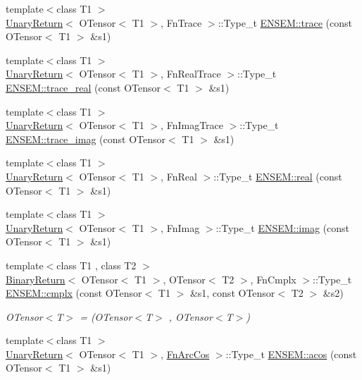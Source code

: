 \begin{DoxyCompactItemize}
{\footnotesize template$<$class T1 $>$ }\\\mbox{\hyperlink{structUnaryReturn}{Unary\+Return}}$<$ O\+Tensor$<$ T1 $>$, Fn\+Trace $>$\+::Type\+\_\+t \mbox{\hyperlink{group__obstensor_gade63bf28037560bb8bb80db95b64eacf}{E\+N\+S\+E\+M\+::trace}} (const O\+Tensor$<$ T1 $>$ \&s1)
\item 
{\footnotesize template$<$class T1 $>$ }\\\mbox{\hyperlink{structUnaryReturn}{Unary\+Return}}$<$ O\+Tensor$<$ T1 $>$, Fn\+Real\+Trace $>$\+::Type\+\_\+t \mbox{\hyperlink{group__obstensor_ga540149a8c9955de22cf6c5562ec69f2f}{E\+N\+S\+E\+M\+::trace\+\_\+real}} (const O\+Tensor$<$ T1 $>$ \&s1)
\item 
{\footnotesize template$<$class T1 $>$ }\\\mbox{\hyperlink{structUnaryReturn}{Unary\+Return}}$<$ O\+Tensor$<$ T1 $>$, Fn\+Imag\+Trace $>$\+::Type\+\_\+t \mbox{\hyperlink{group__obstensor_gab134dab9b5acf4d2d372b22d17d4b307}{E\+N\+S\+E\+M\+::trace\+\_\+imag}} (const O\+Tensor$<$ T1 $>$ \&s1)
\item 
{\footnotesize template$<$class T1 $>$ }\\\mbox{\hyperlink{structUnaryReturn}{Unary\+Return}}$<$ O\+Tensor$<$ T1 $>$, Fn\+Real $>$\+::Type\+\_\+t \mbox{\hyperlink{group__obstensor_ga6d95b4347a14db99d06a34a4aa52038b}{E\+N\+S\+E\+M\+::real}} (const O\+Tensor$<$ T1 $>$ \&s1)
\item 
{\footnotesize template$<$class T1 $>$ }\\\mbox{\hyperlink{structUnaryReturn}{Unary\+Return}}$<$ O\+Tensor$<$ T1 $>$, Fn\+Imag $>$\+::Type\+\_\+t \mbox{\hyperlink{group__obstensor_ga8fd330e1f2838b575c200fc264a4d95b}{E\+N\+S\+E\+M\+::imag}} (const O\+Tensor$<$ T1 $>$ \&s1)
\item 
{\footnotesize template$<$class T1 , class T2 $>$ }\\\mbox{\hyperlink{structBinaryReturn}{Binary\+Return}}$<$ O\+Tensor$<$ T1 $>$, O\+Tensor$<$ T2 $>$, Fn\+Cmplx $>$\+::Type\+\_\+t \mbox{\hyperlink{group__obstensor_gaabe3804eba50d35ba93cf516f1e5a85b}{E\+N\+S\+E\+M\+::cmplx}} (const O\+Tensor$<$ T1 $>$ \&s1, const O\+Tensor$<$ T2 $>$ \&s2)
\begin{DoxyCompactList}\small\item\em O\+Tensor$<$\+T$>$ = (O\+Tensor$<$\+T$>$ , O\+Tensor$<$\+T$>$) \end{DoxyCompactList}\item 
{\footnotesize template$<$class T1 $>$ }\\\mbox{\hyperlink{structUnaryReturn}{Unary\+Return}}$<$ O\+Tensor$<$ T1 $>$, \mbox{\hyperlink{structFnArcCos}{Fn\+Arc\+Cos}} $>$\+::Type\+\_\+t \mbox{\hyperlink{group__obstensor_gae3685afbb0e9aa5d37b76c81e344a490}{E\+N\+S\+E\+M\+::acos}} (const O\+Tensor$<$ T1 $>$ \&s1)

\end{DoxyCompactItemize}
